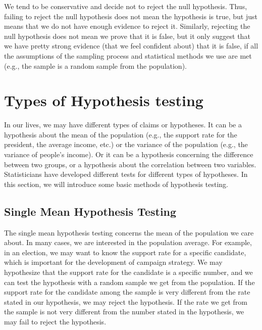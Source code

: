 \documentclass{book}
\begin{document}
We tend to be conservative and decide not to reject the null hypothesis. Thus,
failing to reject the null hypothesis does not mean the hypothesis is true,
but just means that we do not have enough evidence to reject it. Similarly,
rejecting the null hypothesis does not mean we prove that it is false, but it
only suggest that we have pretty strong evidence (that we feel confident
about) that it is false, if all the assumptions of the sampling process and
statistical methods we use are met (e.g., the sample is a random sample from
the population).

\hypertarget{types-of-hypothesis-testing}{%
\section{Types of Hypothesis testing}\label{types-of-hypothesis-testing}}

In our lives, we may have different types of claims or hypotheses. It can be a
hypothesis about the mean of the population (e.g., the support rate for the
president, the average income, etc.) or the variance of the population (e.g.,
the variance of people's income). Or it can be a hypothesis concerning the
difference between two groups, or a hypothesis about the correlation between
two variables. Statisticians have developed different tests for different
types of hypotheses. In this section, we will introduce some basic methods of
hypothesis testing.

\hypertarget{single-mean-hypothesis-testing}{%
\subsection{Single Mean Hypothesis
Testing}\label{single-mean-hypothesis-testing}}

The single mean hypothesis testing concerns the mean of the population we care
about. In many cases, we are interested in the population average. For
example, in an election, we may want to know the support rate for a specific
candidate, which is important for the development of campaign strategy. We may
hypothesize that the support rate for the candidate is a specific number, and
we can test the hypothesis with a random sample we get from the population. If
the support rate for the candidate among the sample is very different from the
rate stated in our hypothesis, we may reject the hypothesis. If the rate we
get from the sample is not very different from the number stated in the
hypothesis, we may fail to reject the hypothesis.
\end{document}
